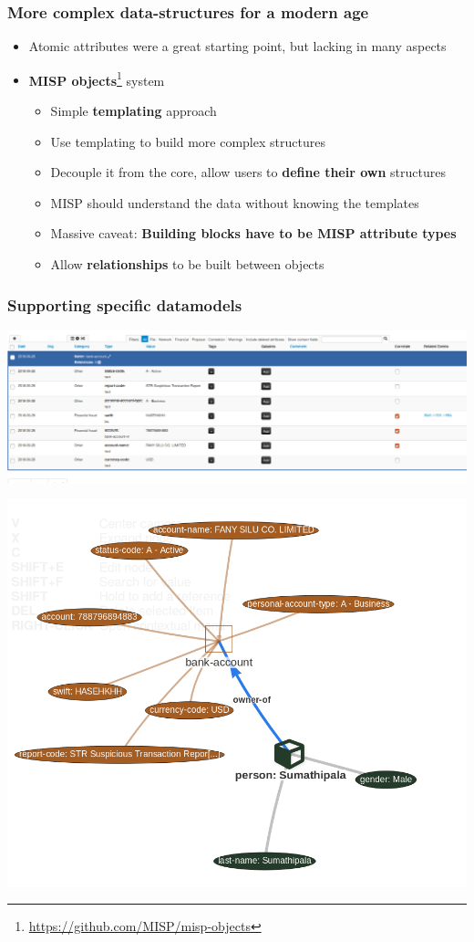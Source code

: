\begin{frame}
  \frametitle{More complex data-structures for a modern age}
  \begin{itemize}
    \item Atomic attributes were a great starting point, but lacking in many aspects
    \item {\bf MISP objects}\footnote{\url{https://github.com/MISP/misp-objects}} system
    \begin{itemize}
      \item Simple {\bf templating} approach
      \item Use templating to build more complex structures
      \item Decouple it from the core, allow users to {\bf define their own} structures
      \item MISP should understand the data without knowing the templates
      \item Massive caveat: {\bf Building blocks have to be MISP attribute types}
      \item Allow {\bf relationships} to be built between objects
    \end{itemize}
  \end{itemize}
\end{frame}

\begin{frame}
  \frametitle{Supporting specific datamodels}
  \begin{center}
    \includegraphics[scale=0.24]{bankaccount.png}
  \end{center}
  \begin{center}
    \includegraphics[scale=0.18]{bankview.png}
  \end{center}
\end{frame}

